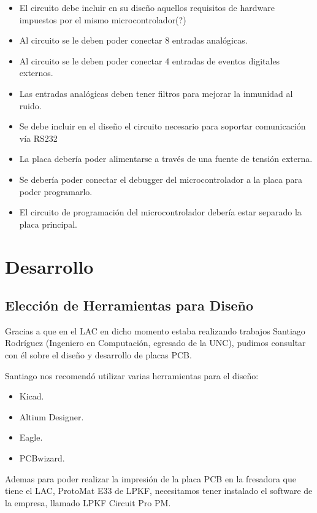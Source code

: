 \begin{itemize}
\item El circuito debe incluir en su diseño aquellos requisitos de hardware impuestos por el mismo microcontrolador(?)
\item Al circuito se le deben poder conectar 8 entradas analógicas.
\item Al circuito se le deben poder conectar 4 entradas de eventos digitales externos.
\item Las entradas analógicas deben tener filtros para mejorar la inmunidad al ruido.
\item Se debe incluir en el diseño el circuito necesario para soportar comunicación vía RS232
\item La placa debería poder alimentarse a través de una fuente de tensión externa.
\item Se debería poder conectar el debugger del microcontrolador a la placa para poder programarlo.
\item El circuito de programación del microcontrolador debería estar separado la placa principal.
\end{itemize}



\section{Desarrollo} %
\label{sec:desarrollo}

\subsection{Elección de Herramientas para Diseño} %
\label{sec:herramientas_para_diseno}

Gracias a que en el LAC en dicho momento estaba realizando trabajos Santiago Rodríguez (Ingeniero en Computación, egresado de la UNC), pudimos consultar con él sobre el diseño y desarrollo de placas PCB. 

Santiago nos recomendó utilizar varias herramientas para el diseño:
\begin{itemize}
\item Kicad.
\item Altium Designer.
\item Eagle.
\item PCBwizard.
\end{itemize}

Ademas para poder realizar la impresión de la placa PCB en la fresadora que tiene el LAC, ProtoMat E33 de LPKF, necesitamos tener instalado el software de la empresa, llamado LPKF Circuit Pro PM.


